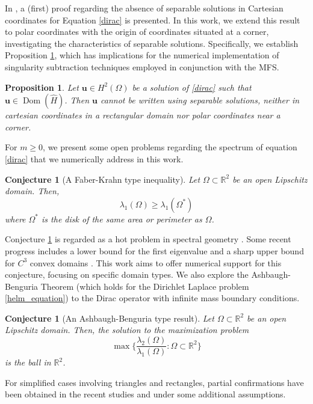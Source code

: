 \documentclass[5p,authoryear]{elsarticle}
\newtheorem{proposition}[theorem]{Proposition}
\newtheorem{conjecture}[theorem]{Conjecture}
\DeclareMathOperator{\dom}{Dom}
\begin{document}
In \cite{briet2022spectral}, a (first) proof regarding the absence of separable solutions in Cartesian coordinates for Equation \eqref{dirac} is presented. In this work, we extend this result to polar coordinates with the origin of coordinates situated at a corner, investigating the characteristics of separable solutions. Specifically, we establish Proposition \ref{dirac_not_polar}, which has implications for the numerical implementation of singularity subtraction techniques employed in conjunction with the MFS.
\begin{proposition}\label{dirac_not_polar}
    Let \(\mathbf{u} \in H^2(\Omega)\) be a solution of \eqref{dirac} such that \(\mathbf{u} \in \dom(\hat{H})\). Then \(\mathbf{u}\) cannot be written using separable solutions, neither in cartesian coordinates in a rectangular domain nor polar coordinates near a corner.
\end{proposition}
For \(m \geq 0\), we present some open problems regarding the spectrum of equation \eqref{dirac} that we numerically address in this work.
\begin{conjecture}[A Faber-Krahn type inequality]\label{conjecture_faber_krahn}
    Let \(\Omega \subset \mathbb{R}^2\) be an open Lipschitz domain. Then,
    \[
    \lambda_1(\Omega) \geq \lambda_1(\Omega^\ast)
    \]
    where \(\Omega^\ast\) is the disk of the same area or perimeter as \(\Omega\).
\end{conjecture}
\sloppy Conjecture \ref{conjecture_faber_krahn} is regarded as a hot problem in spectral geometry \cite{krejcirik_larson_lotoreichik_2019}. Some recent progress includes a lower bound for the first eigenvalue \cite{benguria2017spectral} and a sharp upper bound for \(C^3\) convex domains \cite{lotoreichik2019sharp}. This work aims to offer numerical support for this conjecture, focusing on specific domain types. We also explore the Ashbaugh-Benguria Theorem (which holds for the Dirichlet Laplace problem \eqref{helm_equation}) to the Dirac operator with infinite mass boundary conditions.
\begin{conjecture}[An Ashbaugh-Benguria type result]\label{conjecture_benguria}
    Let \(\Omega \subset \mathbb{R}^2\) be an open Lipschitz domain. Then, the solution to the maximization problem
    \[
    \max \Big\{\frac{\lambda_2(\Omega)}{\lambda_1(\Omega)}: \Omega \subset \mathbb{R}^2\Big\}
    \]
    is the ball in \(\mathbb{R}^2\).
\end{conjecture}
For simplified cases involving triangles and rectangles, partial confirmations have been obtained in the recent studies \cite{briet2022spectral} and \cite{vu2023spectral} under some additional assumptions.
\end{document}
